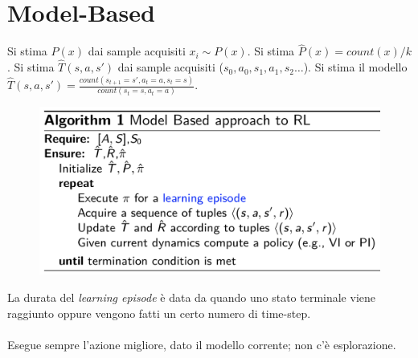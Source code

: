 \documentclass[a4paper, notitlepage, 9pt]{extreport}
\begin{document}
\section*{Model-Based}
Si stima $P(x)$ dai sample acquisiti $x_i \sim P(x)$. Si stima $\hat{P}(x) = count(x)/k$.
Si stima $\hat{T}(s, a, s')$ dai sample acquisiti ($s_0, a_0, s_1, a_1, s_2 \dots$). Si stima il modello $\hat{T}(s, a, s') = \frac{count(s_{t+1}=s', a_t=a, s_t=s)}{count(s_t=s, a_t = a)}$.
\begin{multicols}{2}
	\begin{figure}[H]
		\centering
		\includegraphics[scale=0.23]{RL}
	\end{figure}
\columnbreak
	\noindent
	La durata del \textit{learning episode} è data da quando uno stato terminale viene raggiunto oppure vengono fatti un certo numero di time-step.\\\\
	Esegue sempre l'azione migliore, dato il modello corrente; non c'è esplorazione.
\end{multicols}
\end{document}
